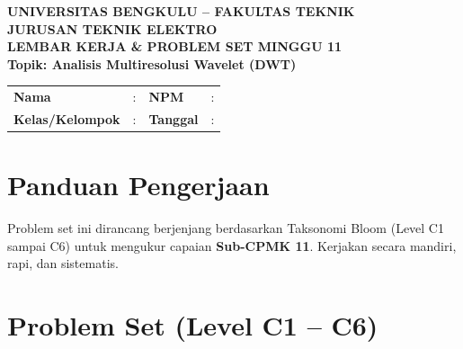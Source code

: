 \documentclass[11pt,a4paper]{article}
\begin{document}
\begin{center}
    {\large \textbf{\color{primaryblue}UNIVERSITAS BENGKULU -- FAKULTAS TEKNIK}}\\[0.1cm]
    {\large \textbf{\color{secondaryblue}JURUSAN TEKNIK ELEKTRO}}\\[0.25cm]
    {\LARGE \textbf{\color{primaryblue}LEMBAR KERJA \& PROBLEM SET MINGGU 11}}\\[0.1cm]
    {\normalsize \textbf{Topik: Analisis Multiresolusi Wavelet (DWT)}}
\end{center}

\vspace{0.2cm}

\begin{tcolorbox}[colback=boxbg,colframe=primaryblue,arc=2mm,title=\textbf{Identitas Mahasiswa}]
\small
\begin{tabular}{p{2.5cm}p{5.5cm}p{2.5cm}p{4.5cm}}
\textbf{Nama} & : \dotfill & \textbf{NPM} & : \dotfill \\
\textbf{Kelas/Kelompok} & : \dotfill & \textbf{Tanggal} & : \dotfill \\
\end{tabular}
\end{tcolorbox}

\vspace{0.2cm}

\section{Panduan Pengerjaan}
Problem set ini dirancang berjenjang berdasarkan Taksonomi Bloom (Level C1 sampai C6) untuk mengukur capaian \textbf{Sub-CPMK 11}. Kerjakan secara mandiri, rapi, dan sistematis.

\section{Problem Set (Level C1 -- C6)}
\end{document}
